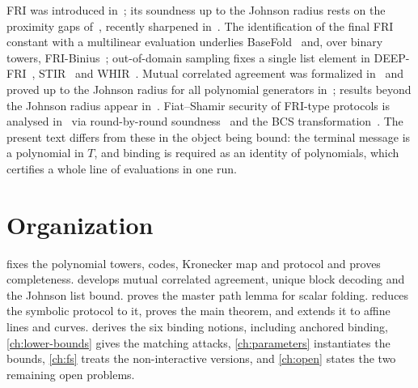 FRI was introduced in~\cite{BBHR18}; its soundness up to the Johnson radius rests on the
proximity gaps of~\cite{BCIKS20}, recently sharpened in~\cite{BCHKS25,DKT26}.
The identification of the final FRI constant with a multilinear evaluation underlies
BaseFold~\cite{BaseFold} and, over binary towers, FRI-Binius~\cite{DP24}; out-of-domain
sampling fixes a single list element in DEEP-FRI~\cite{DEEPFRI}, STIR~\cite{STIR} and
WHIR~\cite{WHIR}. Mutual correlated agreement was formalized in~\cite{WHIR} and proved up
to the Johnson radius for all polynomial generators in~\cite{BCGM26}; results beyond
the Johnson radius appear in~\cite{Jo26,DKT26,Jer26}. Fiat--Shamir security of FRI-type
protocols is analysed in~\cite{BGKTTZ23} via round-by-round soundness~\cite{CCHLRRW19}
and the BCS transformation~\cite{BCS16}. The present text differs from these in the object
being bound: the terminal message is a polynomial in $T$, and binding is required as an
identity of polynomials, which certifies a whole line of evaluations in one run.

\section*{Organization}

 fixes the polynomial towers, codes, Kronecker map and protocol and
proves completeness.  develops mutual correlated agreement, unique block
decoding and the Johnson list bound.  proves the master path lemma for scalar
folding.  reduces the symbolic protocol to it, proves the main
theorem, and extends it to affine lines and curves.  derives the six
binding notions, including anchored binding, \cref{ch:lower-bounds} gives the matching
attacks, \cref{ch:parameters} instantiates the bounds, \cref{ch:fs} treats the
non-interactive versions, and \cref{ch:open} states the two remaining open problems.
